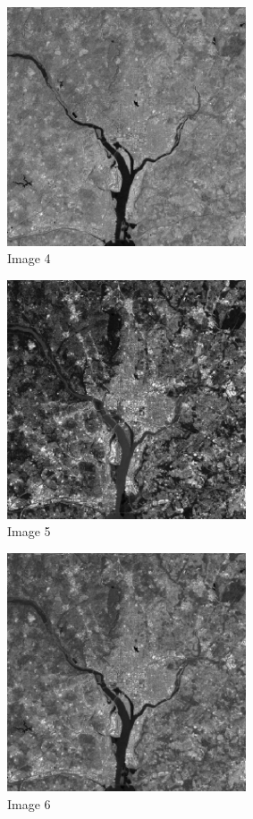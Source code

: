 \documentclass[10pt]{article}
\begin{document}
\begin{figure}[!ht]
	\centering
	\includegraphics[height=200pt]{./ex10/Wash4.jpg}
	\caption{Image 4}
\end{figure}
\begin{figure}[!ht]
	\centering
	\includegraphics[height=200pt]{./ex10/Wash5.jpg}
	\caption{Image 5}
\end{figure}
\begin{figure}[!ht]
	\centering
	\includegraphics[height=200pt]{./ex10/Wash6.jpg}
	\caption{Image 6}
\end{figure}
\end{document}
